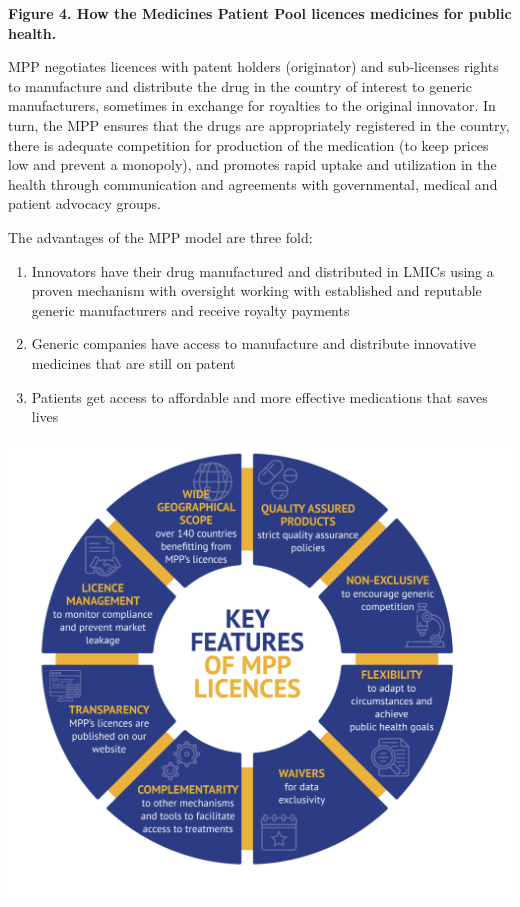 \documentclass[
  11pt,
  paper=a4,
  ,captions=tableheading
]{scrartcl}
\providecommand{\tightlist}{%
  \setlength{\itemsep}{0pt}\setlength{\parskip}{0pt}}
\begin{document}
\textbf{Figure 4. How the Medicines Patient Pool licences medicines for
public health.}

MPP negotiates licences with patent holders (originator) and
sub-licenses rights to manufacture and distribute the drug in the
country of interest to generic manufacturers, sometimes in exchange for
royalties to the original innovator. In turn, the MPP ensures that the
drugs are appropriately registered in the country, there is adequate
competition for production of the medication (to keep prices low and
prevent a monopoly), and promotes rapid uptake and utilization in the
health through communication and agreements with governmental, medical
and patient advocacy groups.

The advantages of the MPP model are three fold:

\begin{enumerate}
\def\labelenumi{\arabic{enumi}.}
\tightlist
\item
  Innovators have their drug manufactured and distributed in LMICs using
  a proven mechanism with oversight working with established and
  reputable generic manufacturers and receive royalty payments
\item
  Generic companies have access to manufacture and distribute innovative
  medicines that are still on patent
\item
  Patients get access to affordable and more effective medications that
  saves lives
\end{enumerate}

\includegraphics[width=6.25in,height=\textheight]{images/mpp_2.png}
\end{document}
